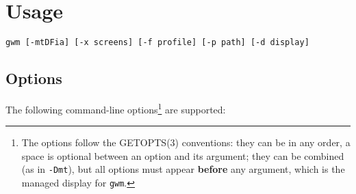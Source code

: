 \chapter{Usage}
{\tt gwm [-mtDFia] [-x screens]  [-f profile] [-p path] [-d display]}

\section{Options}

The following command-line options\footnote{The options follow the
GETOPTS(3) conventions: they can be in any order, a space is optional between
an option and its argument; they can be combined (as in {\tt -Dmt}), but all
options must appear {\bf before} any argument, which is the managed display
for {\tt gwm}.} are supported:

